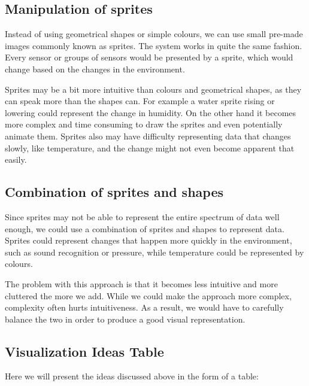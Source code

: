 \documentclass[../document.tex]{subfiles}
\begin{document}
\subsection{Manipulation of sprites}
Instead of using geometrical shapes or simple colours, we can use small pre-made images commonly known as sprites. The system works in quite the same fashion. Every sensor or groups of sensors would be presented by a sprite, which would change based on the changes in the environment.

Sprites may be a bit more intuitive than colours and geometrical shapes, as they can speak more than the shapes can. For example a water sprite rising or lowering could represent the change in humidity. On the other hand it becomes more complex and time consuming to draw the sprites and even potentially animate them. Sprites also may have difficulty representing data that changes slowly, like temperature, and the change might not even become apparent that easily.

\subsection{Combination of sprites and shapes}
Since sprites may not be able to represent the entire spectrum of data well enough, we could use a combination of sprites and shapes to represent data. Sprites could represent changes that happen more quickly in the environment, such as sound recognition or pressure, while temperature could be represented by colours.

The problem with this approach is that it becomes less intuitive and more cluttered the more we add. While we could make the approach more complex, complexity often hurts intuitiveness. As a result, we would have to carefully balance the two in order to produce a good visual representation.

\subsection{Visualization Ideas Table}
Here we will present the ideas discussed above in the form of a table:
\end{document}
